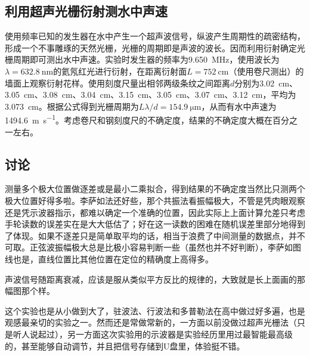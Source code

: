 \documentclass[UTF8]{ctexart}
\begin{document}
\subsection{利用超声光栅衍射测水中声速}
使用频率已知的发生器在水中产生一个超声波信号，纵波产生周期性的疏密结构，形成一个不事雕琢的天然光栅，光栅的周期即是声波的波长。因而利用衍射确定光栅周期即可测出水中声速。实验时发生器的频率为\SI{9.650}{\MHz}，使用波长为$\lambda=\SI{632.8}{\nm}$的氦氖红光进行衍射，在距离衍射面$L=\SI{752}{\cm}$（使用卷尺测出）的墙面上观察衍射花样。使用刻度尺量出相邻两级条纹之间距离$d$分别为\SI{3.02}{\cm}、\SI{3.05}{\cm}、\SI{3.08}{\cm}、\SI{3.04}{\cm}、\SI{3.15}{\cm}、\SI{3.05}{\cm}、\SI{3.07}{\cm}、\SI{3.12}{\cm}，平均为\SI{3.073}{\cm}。根据公式得到光栅周期为$L\lambda/d=\SI{154.9}{\micro\meter}$，从而有水中声速为\SI{1494.6}{\meter\per\second}。考虑卷尺和钢刻度尺的不确定度，结果的不确定度大概在百分之一左右。
\subsection{讨论}
测量多个极大位置做逐差或是最小二乘拟合，得到结果的不确定度当然比只测两个极大位置好得多啦。李萨如法还好些，那个共振法看振幅极大，不管是凭肉眼观察还是凭示波器指示，都难以确定一个准确的位置，因此实际上上面计算允差只考虑手轮读数的误差实在是大大低估了；好在这一读数的困难在随机误差里部分地得到了体现。如果不逐差只是简单取平均的话，相当于浪费了中间测量的数据点，并不可取。正弦波振幅极大总是比极小容易判断一些（虽然也并不好判断），李萨如图线也是，直线位置比其他位置在定位的精确度上高得多。

声波信号随距离衰减，应该是服从类似平方反比的规律的，大致就是长上面画的那幅图那个样。

这个实验也是从小做到大了，驻波法、行波法和多普勒法在高中做过好多遍，也是观感最亲切的实验之一。然而还是常做常新的，一方面以前没做过超声光栅法（只是听人说起过），另一方面这次实验用的示波器是实验经历里用过最智能最高级的，甚至能够自动调节，并且把信号存储到U盘里，体验挺不错。
\end{document}
